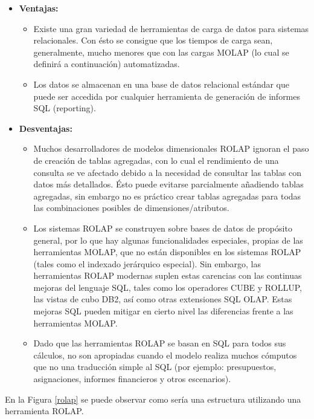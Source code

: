 \documentclass[a4paper,11pt]{article}
\begin{document}
    \begin{itemize}
      \item \textbf{Ventajas:}
        \begin{itemize}
          \item Existe una gran variedad de herramientas de carga de datos para sistemas relacionales. Con ésto se consigue que los tiempos de carga
          sean, generalmente, mucho menores que con las cargas MOLAP (lo cual se definirá a continuación) automatizadas.
          \item Los datos se almacenan en una base de datos relacional estándar que puede ser accedida por cualquier herramienta de generación de
          informes SQL (reporting).
        \end{itemize}
      \item \textbf{Desventajas:}
        \begin{itemize}
          \item Muchos desarrolladores de modelos dimensionales ROLAP ignoran el paso de creación de tablas agregadas, con lo cual el rendimiento de
          una consulta se ve afectado debido a la necesidad de consultar las tablas con datos más detallados. Ésto puede evitarse parcialmente
          añadiendo tablas agregadas, sin embargo no es práctico crear tablas agregadas para todas las combinaciones posibles de dimensiones/atributos.
          \item Los sistemas ROLAP se construyen sobre bases de datos de propósito general, por lo que hay algunas funcionalidades especiales, propias
          de las herramientas MOLAP, que no están disponibles en los sistemas ROLAP (tales como el indexado jerárquico especial). Sin embargo, las
          herramientas ROLAP modernas suplen estas carencias con las continuas mejoras del lenguaje SQL, tales como los operadores CUBE y ROLLUP, las
          vistas de cubo DB2, así como otras extensiones SQL OLAP. Estas mejoras SQL pueden mitigar en cierto nivel las diferencias frente a las
          herramientas MOLAP.
          \item Dado que las herramientas ROLAP se basan en SQL para todos sus cálculos, no son apropiadas cuando el modelo realiza muchos cómputos que
          no una traducción simple al SQL (por ejemplo: presupuestos, asignaciones, informes financieros y otros escenarios).
        \end{itemize}
    \end{itemize}
    
    En la Figura \ref{rolap} se puede observar como sería una estructura utilizando una herramienta ROLAP.
    
\end{document}
